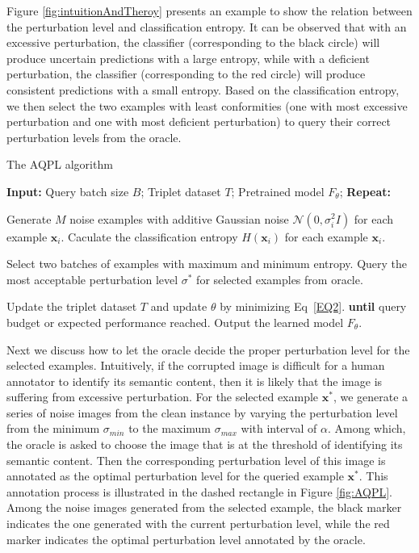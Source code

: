 \documentclass[letterpaper]{article} %
\begin{document}
Figure \ref{fig:intuitionAndTheroy} presents an example to show the relation between the perturbation level and classification entropy. It can be observed that with an excessive perturbation, the classifier (corresponding to the black circle) will produce uncertain predictions with a large entropy, while with a deficient perturbation, the classifier (corresponding to the red circle) will produce consistent predictions with a small entropy. Based on the classification entropy, we then select the two examples with least conformities (one with most excessive perturbation and one with most deficient perturbation) to query their correct perturbation levels from the oracle.

\begin{algorithm}[t]

	\caption{The AQPL algorithm}
	\label{alg:AQPL}
	\begin{algorithmic}[1]
		\STATE \textbf{Input:}
		\STATE \quad Query batch size $B$;
		\STATE \quad Triplet dataset $T$;
		\STATE \quad Pretrained model $F_\theta$;
		\STATE \textbf{Repeat:}

		\STATE \quad Generate $M$ noise examples with additive Gaussian noise $\mathcal{N}(0,\sigma_i^2 I)$ for each example $\mathbf{x}_i$.
		\STATE \quad Caculate the classification entropy $H(\mathbf{x}_i)$ for each example $\mathbf{x}_i$.

		\STATE \quad Select two batches of examples with maximum and minimum entropy.
		\STATE \quad Query the most acceptable perturbation level $\sigma^*$ for selected examples from oracle.


		\STATE \quad Update the triplet dataset $T$ and update $\theta$ by minimizing Eq~\ref{EQ2}.
		\STATE \textbf{until} query budget or expected performance reached.
		\STATE Output the learned model $F_\theta$.

	\end{algorithmic}
\end{algorithm}

Next we discuss how to let the oracle decide the proper perturbation level for the selected examples. Intuitively, if the corrupted image is difficult for a human annotator to identify its semantic content, then it is likely that the image is suffering from excessive perturbation. For the selected example $\mathbf{x}^*$, we generate a series of noise images from the clean instance by varying the perturbation level from the minimum $\sigma_{min}$ to the maximum $\sigma_{max}$ with interval of $\alpha$. Among which, the oracle is asked to choose the image that is at the threshold of identifying its semantic content. Then the corresponding perturbation level of this image is annotated as the optimal perturbation level for the queried example $\mathbf{x}^*$. This annotation process is illustrated in the dashed rectangle in Figure \ref{fig:AQPL}. Among the noise images generated from the selected example, the black marker indicates the one generated with the current perturbation level, while the red marker indicates the optimal perturbation level annotated by the oracle.
\end{document}
